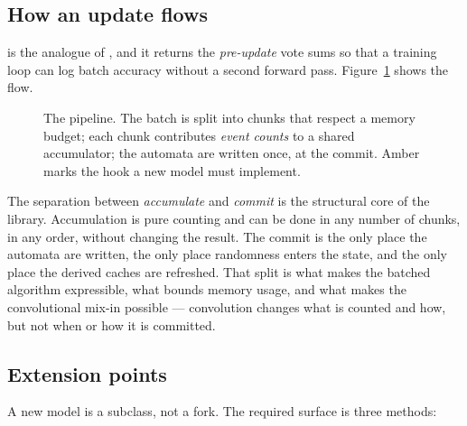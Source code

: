 \subsection{How an update flows}

 is the analogue of , and it
returns the \emph{pre-update} vote sums so that a training loop can log batch accuracy
without a second forward pass. Figure~\ref{fig:pipeline} shows the flow.

\begin{figure}[htbp]
\centering
\resizebox{\linewidth}{!}{}
\caption{The  pipeline. The batch is split into chunks that respect a memory
  budget; each chunk contributes \emph{event counts} to a shared accumulator; the automata
  are written once, at the commit. Amber marks the hook a new model must implement.}
\label{fig:pipeline}
\end{figure}

The separation between \emph{accumulate} and \emph{commit} is the structural core of the
library. Accumulation is pure counting and can be done in any number of chunks, in any order,
without changing the result. The commit is the only place the automata are written, the only
place randomness enters the state, and the only place the derived caches are refreshed. That
split is what makes the batched algorithm expressible, what bounds memory usage, and what
makes the convolutional mix-in possible --- convolution changes what is counted and how, but
not when or how it is committed.

\subsection{Extension points}

A new model is a subclass, not a fork. The required surface is three methods:


